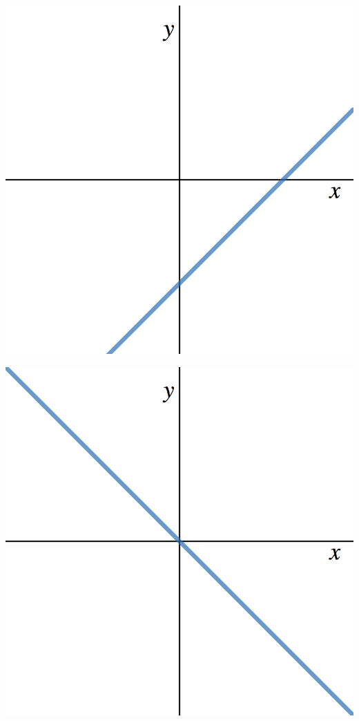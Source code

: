 \documentclass[11pt]{exam}
\theoremstyle{definition}
\begin{document}
\begin{questions}
\begin{enumerate}[(I)]
\begin{minipage}{.35\textwidth}
	\end{minipage}
\vskip 5mm
	\begin{minipage}{.35\textwidth}
	\item \includegraphics[scale=0.1]{Figures/linearIV.png}
	\end{minipage}
	\begin{minipage}{.35\textwidth}
	\item \includegraphics[scale=0.1]{Figures/linearV.png}

\end{minipage}
\end{enumerate}
\end{questions}
\end{document}
